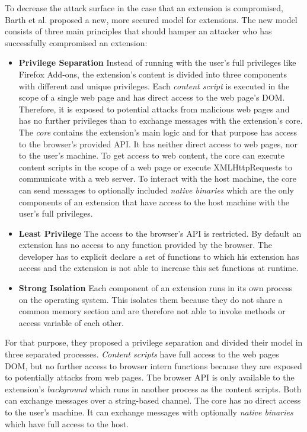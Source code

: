 	To decrease the attack surface in the case that an extension is compromised, Barth et al. proposed a new, more secured model for extensions. The new model consists of three main principles that should hamper an attacker who has successfully compromised an extension: 
	
	\begin{itemize}
		\item \textbf{Privilege Separation} Instead of running with the user's full privileges like Firefox Add-ons, the extension's content is divided into three components with different and unique privileges. Each \textit{content script} is executed in the scope of a single web page and has direct access to the web page's DOM. Therefore, it is exposed to potential attacks from malicious web pages and has no further privileges than to exchange messages with the extension's core. The \textit{core} contains the extension's main logic and for that purpose has access to the browser's provided API. It has neither direct access to web pages, nor to the user's machine. To get access to web content, the core can execute content scripts in the scope of a web page or execute XMLHttpRequests to communicate with a web server. To interact with the host machine, the core can send messages to optionally included \textit{native binaries} which are the only components of an extension that have access to the host machine with the user's full privileges. 
		\item \textbf{Least Privilege} The access to the browser's API is restricted. By default an extension has no access to any function provided by the browser. The developer has to explicit declare a set of functions to which his extension has access and the extension is not able to increase this set functions at runtime.
		\item \textbf{Strong Isolation} Each component of an extension runs in its own process on the operating system. This isolates them because they do not share a common memory section and are therefore not able to invoke methods or access variable of each other. 
	\end{itemize}
	
	
	For that purpose, they proposed a privilege separation and divided their model in three separated processes. \textit{Content scripts} have full access to the web pages DOM, but no further access to browser intern functions because they are exposed to potentially attacks from web pages. The browser API is only available to the extension's \textit{background} which runs in another process as the content scripts. Both can exchange messages over a string-based channel. The core has no direct access to the user's machine. It can exchange messages with optionally \textit{native binaries} which have full access to the host. \\
	
